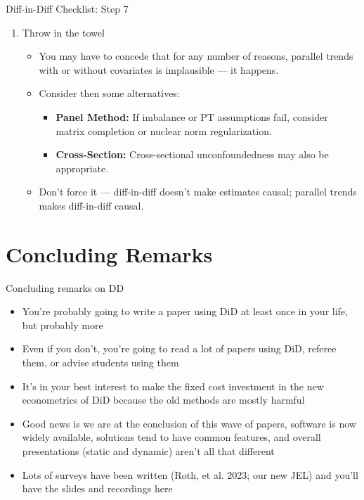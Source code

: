 \documentclass{beamer}
\begin{document}
\begin{frame}{Diff-in-Diff Checklist: Step 7}
\begin{enumerate}
    \item[7.] Throw in the towel
    \begin{itemize}
        \item You may have to concede that for any number of reasons, parallel trends with or without covariates is implausible — it happens.
        \item Consider then some alternatives:
        \begin{itemize}
            \item \textbf{Panel Method:} If imbalance or PT assumptions fail, consider matrix completion or nuclear norm regularization.
            \item \textbf{Cross-Section:} Cross-sectional unconfoundedness may also be appropriate.
        \end{itemize}
        \item Don’t force it — diff-in-diff doesn't make estimates causal; parallel trends makes diff-in-diff causal.
    \end{itemize}
\end{enumerate}
\end{frame}


\section{Concluding Remarks}

\begin{frame}{Concluding remarks on DD}

\begin{itemize} 
\item You're probably going to write a paper using DiD at least once in your life, but probably more
\item Even if you don't, you're going to read a lot of papers using DiD, referee them, or advise students using them
\item It's in your best interest to make the fixed cost investment in the new econometrics of DiD because the old methods are mostly harmful
\item Good news is we are at the conclusion of this wave of papers, software is now widely available, solutions tend to have common features, and overall presentations (static and dynamic) aren't all that different
\item Lots of surveys have been written (Roth, et al. 2023; our new JEL) and you'll have the slides and recordings here
\end{itemize}

\end{frame}
\end{document}
